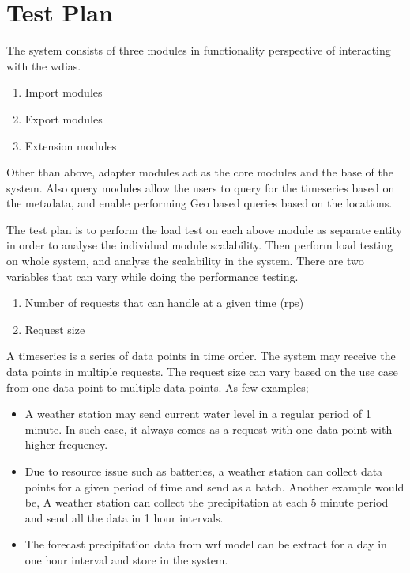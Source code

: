 \section{Test Plan}
The system consists of three modules in functionality perspective of interacting with the \acrshort{wdias}.
\begin{enumerate}
    \item Import modules
    \item Export modules
    \item Extension modules
\end{enumerate}
Other than above, adapter modules act as the core modules and the base of the system. Also query modules allow the users to query for the timeseries
based on the metadata, and enable performing Geo based queries based on the locations.

The test plan is to perform the load test on each above module as separate entity in order to analyse the individual module scalability.
Then perform load testing on whole system, and analyse the scalability in the system. There are two variables that can vary while doing the performance testing.
\begin{enumerate}
    \item Number of requests that can handle at a given time (\acrfull{rps})
    \item Request size
\end{enumerate}
A timeseries is a series of data points in time order. The system may receive the data points in multiple requests.
The request size can vary based on the use case from one data point to multiple data points. As few examples;
\begin{itemize}
    \item A weather station may send current water level in a regular period of 1 minute. In such case, it always comes as a request with one data point with higher frequency.
    \item Due to resource issue such as batteries, a weather station can collect data points for a given period of time and send as a batch. Another example would be,
A weather station can collect the precipitation at each 5 minute period and send all the data in 1 hour intervals.
    \item The forecast precipitation data from \acrshort{wrf} model can be extract for a day in one hour interval and store in the system.
\end{itemize}

